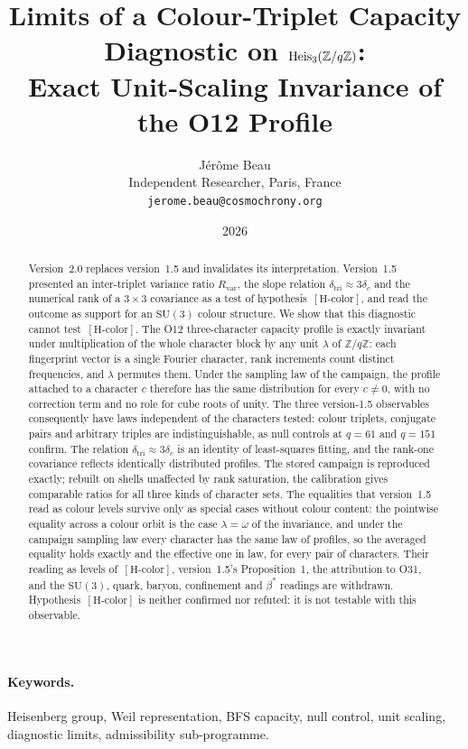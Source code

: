 \documentclass[12pt,a4paper]{article}
\title{Limits of a Colour-Triplet Capacity Diagnostic on $\Heis(\Zq)$:\\
Exact Unit-Scaling Invariance of the O12 Profile}
\author{J\'er\^ome Beau\\
Independent Researcher, Paris, France\\
\texttt{jerome.beau@cosmochrony.org}}
\date{2026}
\theoremstyle{definition}
\theoremstyle{remark}
\newcommand{\Zq}{\mathbb{Z}/q\mathbb{Z}}
\newcommand{\Hcolor}{[\mathrm{H\text{-}color}]}
\newcommand{\Rvar}{R_{\mathrm{var}}}
\newcommand{\dtri}{\delta_{\mathrm{tri}}}
\begin{document}
  \maketitle

  \begin{abstract}
    Version~2.0 replaces version~1.5 and invalidates its interpretation.
    Version~1.5 presented an inter-triplet variance ratio $\Rvar$, the slope relation
    $\dtri\approx3\delta_c$ and the numerical rank of a $3\times3$ covariance as a test of
    hypothesis~$\Hcolor$, and read the outcome as support for an $\mathrm{SU}(3)$ colour structure.
    We show that this diagnostic cannot test~$\Hcolor$.
    The O12 three-character capacity profile is exactly invariant under multiplication of the
    whole character block by any unit $\lambda$ of $\Zq$: each fingerprint vector is a single
    Fourier character, rank increments count distinct frequencies, and $\lambda$ permutes them.
    Under the sampling law of the campaign, the profile attached to a character $c$ therefore has
    the same distribution for every $c\neq0$, with no correction term and no role for cube roots
    of unity.
    The three version-1.5 observables consequently have laws independent of the characters
    tested: colour triplets, conjugate pairs and arbitrary triples are indistinguishable, as null
    controls at $q=61$ and $q=151$ confirm.
    The relation $\dtri\approx3\delta_c$ is an identity of least-squares fitting, and the
    rank-one covariance reflects identically distributed profiles.
    The stored campaign is reproduced exactly; rebuilt on shells unaffected by rank saturation,
    the calibration gives comparable ratios for all three kinds of character sets.
    The equalities that version~1.5 read as colour levels survive only as special cases without
    colour content: the pointwise equality across a colour orbit is the case $\lambda=\omega$ of the
    invariance, and under the campaign sampling law every character has the same law of profiles, so the
    averaged equality holds exactly and the effective one in law, for every pair of characters.
    Their reading as levels of~$\Hcolor$, version~1.5's Proposition~1, the attribution to O31, and the
    $\mathrm{SU}(3)$, quark, baryon, confinement and $\beta^{*}$ readings are withdrawn.
    Hypothesis~$\Hcolor$ is neither confirmed nor refuted: it is not testable with this observable.
  \end{abstract}

  \paragraph{Keywords.}
    Heisenberg group, Weil representation, BFS capacity, null control, unit scaling,
    diagnostic limits, admissibility sub-programme.
\end{document}
